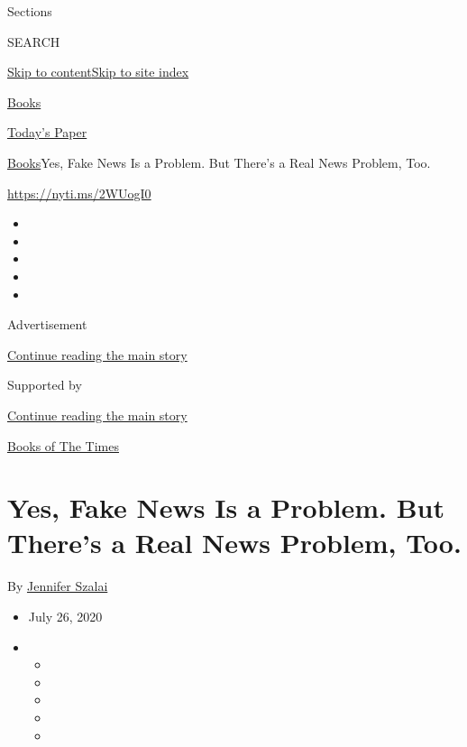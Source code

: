 Sections

SEARCH

\protect\hyperlink{site-content}{Skip to
content}\protect\hyperlink{site-index}{Skip to site index}

\href{https://www.nytimes3xbfgragh.onion/section/books}{Books}

\href{https://myaccount.nytimes3xbfgragh.onion/auth/login?response_type=cookie\&client_id=vi}{}

\href{https://www.nytimes3xbfgragh.onion/section/todayspaper}{Today's
Paper}

\href{/section/books}{Books}\textbar{}Yes, Fake News Is a Problem. But
There's a Real News Problem, Too.

\url{https://nyti.ms/2WUogI0}

\begin{itemize}
\item
\item
\item
\item
\item
\end{itemize}

Advertisement

\protect\hyperlink{after-top}{Continue reading the main story}

Supported by

\protect\hyperlink{after-sponsor}{Continue reading the main story}

\href{/column/books-of-the-times}{Books of The Times}

\hypertarget{yes-fake-news-is-a-problem-but-theres-a-real-news-problem-too}{%
\section{Yes, Fake News Is a Problem. But There's a Real News Problem,
Too.}\label{yes-fake-news-is-a-problem-but-theres-a-real-news-problem-too}}

By \href{https://www.nytimes3xbfgragh.onion/by/jennifer-szalai}{Jennifer
Szalai}

\begin{itemize}
\item
  July 26, 2020
\item
  \begin{itemize}
  \item
  \item
  \item
  \item
  \item
  \end{itemize}
\end{itemize}

